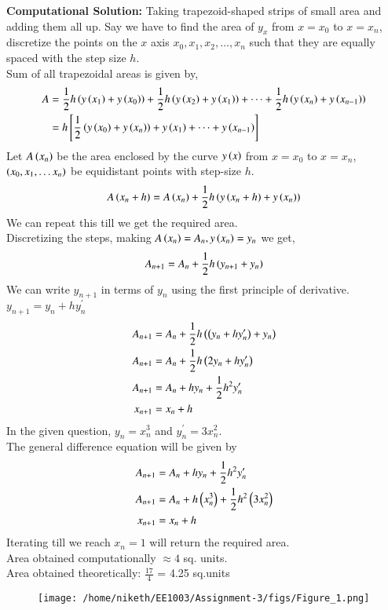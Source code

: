 \documentclass[journal]{IEEEtran}
\begin{document}
\textbf{Computational Solution:} 
Taking trapezoid-shaped strips of small area and adding them all up. Say we have to find the area of $y_{x}$ from $x = x_0$ to $x = x_n$, discretize the points on the $x$ axis $x_0, x_1, x_2, \dots, x_n$ such that they are equally spaced with the step size $h$. \\
Sum of all trapezoidal areas is given by,
\begin{align}
  A &= \frac{1}{2}h\left(y\left(x_1\right)+y\left(x_0\right)\right)+ \frac{1}{2}h\left(y\left(x_2\right)+y\left(x_1\right)\right)+\dots+\frac{1}{2}h\left(y\left(x_n\right)+y\left(x_{n-1}\right)\right)\\
  &= h{}\left[\frac{1}{2}\left(y\left(x_0\right)+y\left(x_n\right)\right)+ y\left(x_1\right)+\dots+y\left(x_{n-1}\right)\right]
\end{align}
Let $A\left(x_n\right)$ be the area enclosed by the curve $y\left(x\right)$ from $x = x_0$ to $x = x_n$, $\left(x_0, x_1, \dots x_n\right)$ be equidistant points with step-size $h$.
\begin{align}
  A\left(x_n+h\right) = A\left(x_n\right)+\frac{1}{2}h\left(y\left(x_n+h\right)+y\left(x_n\right)\right)
\end{align}
We can repeat this till we get the required area.\\
Discretizing the steps, making $A\left(x_n\right) = A_n, y\left(x_n\right) = y_n$ we get,
\begin{align}
 A_{n+1} = A_n+\frac{1}{2}h\left(y_{n+1}+y_n\right)
\end{align}
We can write $y_{n+1}$ in terms of $y_n$ using the first principle of derivative. $y_{n+1} = y_n + hy^{\prime}_n$
\begin{align}
  A_{n+1} &= A_n+\frac{1}{2}h\left(\left(y_{n}+hy^{\prime}_n\right)+y_n\right)\\
  A_{n+1} &= A_n+\frac{1}{2}h\left(2y_n+hy^{\prime}_n\right)\\
  A_{n+1} &= A_n+hy_n+\frac{1}{2}h^2y^{\prime}_n\\
  x_{n+1} &= x_n+h
\end{align}
In the given question, $y_n = x_n^3$ and $y^{\prime}_n = 3 x_n^2$. \\
The general difference equation will be given by
\begin{align}
  A_{n+1} &= A_n+hy_n+\frac{1}{2}h^2y^{\prime}_n\\
  A_{n+1} &= A_n+h\left(x_n^3\right)+\frac{1}{2}h^2\left(3 x_n^2\right)\\
  x_{n+1} &= x_n+h
\end{align}
Iterating till we reach $x_n = 1$ will return the required area. \\

Area obtained computationally $\approx 4$ sq. units.\\

Area obtained theoretically: $\frac{17}{4}$ = 4.25 sq.units\\
\begin{figure}[!ht]
    \centering
    \texttt{[image: /home/niketh/EE1003/Assignment-3/figs/Figure\_1.png]}
    \caption{}
\end{figure}
\end{document}
